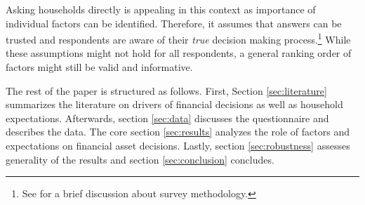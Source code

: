 \documentclass[ProjectABM]{subfiles}
\begin{document}
Asking households directly is appealing in this context as importance of individual factors can be identified. Therefore, it assumes that answers can be trusted and respondents are aware of their \textit{true} decision making process.\footnote{See \cite{choi_2020} for a brief discussion about survey methodology.} While these assumptions might not hold for all respondents, a general ranking order of factors might still be valid and informative.



The rest of the paper is structured as follows. First, Section \ref{sec:literature} summarizes the literature on drivers of financial decisions as well as household expectations. Afterwards, section \ref{sec:data} discusses the questionnaire and describes the data. The core section \ref{sec:results} analyzes the role of factors and expectations on financial asset decisions. Lastly, section \ref{sec:robustness} assesses generality of the results and section \ref{sec:conclusion} concludes.
\end{document}

